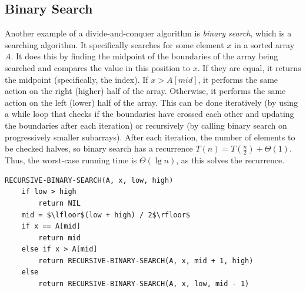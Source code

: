 \documentclass[12pt]{article}
\begin{document}
\subsection{Binary Search}
Another example of a divide-and-conquer algorithm is \textit{binary search}, which is a searching algorithm.
It specifically searches for some element $x$ in a sorted array $A$. It does this by finding the midpoint of the
boundaries of the array being searched and compares the value in this position to $x$. If they are equal, it returns
the midpoint (specifically, the index). If $x > A[mid]$, it performs the same action on the right (higher) half of the array.
Otherwise, it performs the same action on the left (lower) half of the array. This can be done iteratively (by using a while loop
that checks if the boundaries have crossed each other and updating the boundaries after each iteration) or recursively (by calling binary
search on progressively smaller subarrays). After each iteration, the number of elements to be checked halves, so binary search has a
recurrence $T(n) = T(\frac{n}{2}) + \Theta(1)$. Thus, the worst-case running time is $\Theta(\lg n)$, as this solves the recurrence.
\begin{lstlisting}[mathescape]
    RECURSIVE-BINARY-SEARCH(A, x, low, high)
    if low > high
        return NIL
    mid = $\lfloor$(low + high) / 2$\rfloor$
    if x == A[mid]
        return mid
    else if x > A[mid]
        return RECURSIVE-BINARY-SEARCH(A, x, mid + 1, high)
    else
        return RECURSIVE-BINARY-SEARCH(A, x, low, mid - 1)
\end{lstlisting}
\end{document}
